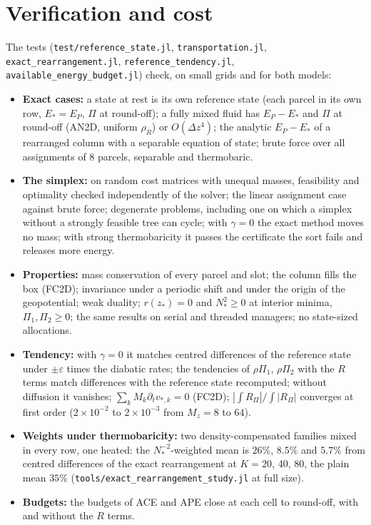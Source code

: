 \documentclass[11pt,a4paper]{article}
\newcommand{\code}[1]{\texttt{#1}}
\newcommand{\zs}{z_{*}}
\begin{document}
\section{Verification and cost}\label{sec:tests}
The tests (\code{test/reference\_state.jl}, \code{transportation.jl}, \code{exact\_rearrangement.jl},
\code{reference\_tendency.jl}, \code{available\_energy\_budget.jl}) check, on small grids and for both models:
\begin{itemize}
  \item \textbf{Exact cases:} a state at rest is its own reference state (each parcel in its own row, $E_*=E_P$, $\Pi$ at
        round-off); a fully mixed fluid has $E_P-E_*$ and $\Pi$ at round-off (AN2D, uniform $\rho_R$) or $O(\Delta z^4)$; the
        analytic $E_P-E_*$ of a rearranged column with a separable equation of state; brute force over all assignments of
        8 parcels, separable and thermobaric.
  \item \textbf{The simplex:} on random cost matrices with unequal masses, feasibility and optimality checked independently
        of the solver; the linear assignment case against brute force; degenerate problems, including one on which a
        simplex without a strongly feasible tree can cycle; with $\gamma=0$ the exact method moves no mass; with strong
        thermobaricity it passes the certificate the sort fails and releases more energy.
  \item \textbf{Properties:} mass conservation of every parcel and slot; the column fills the box (FC2D); invariance under a
        periodic shift and under the origin of the geopotential; weak duality; $r(\zs)=0$ and $N_*^2\ge0$ at interior minima,
        $\Pi_1,\Pi_2\ge0$; the same results on serial and threaded managers; no state-sized allocations.
  \item \textbf{Tendency:} with $\gamma=0$ it matches centred differences of the reference state under $\pm\varepsilon$ times the
        diabatic rates; the tendencies of $\rho\Pi_1$, $\rho\Pi_2$ with the $R$ terms match differences with the reference
        state recomputed; without diffusion it vanishes; $\sum_kM_k\partial_tv_{*,k}=0$ (FC2D); $|\int R_\Pi|/\int|R_\Pi|$
        converges at first order ($2\times10^{-2}$ to $2\times10^{-3}$ from $M_z=8$ to $64$).
  \item \textbf{Weights under thermobaricity:} two density-compensated families mixed in every row, one heated: the
        $N_*^{-2}$-weighted mean is $26\%$, $8.5\%$ and $5.7\%$ from centred differences of the exact rearrangement at
        $K=20$, 40, 80, the plain mean $35\%$ (\code{tools/exact\_rearrangement\_study.jl} at full size).
  \item \textbf{Budgets:} the budgets of ACE and APE close at each cell to round-off, with and without the $R$ terms.
\end{itemize}
\end{document}
